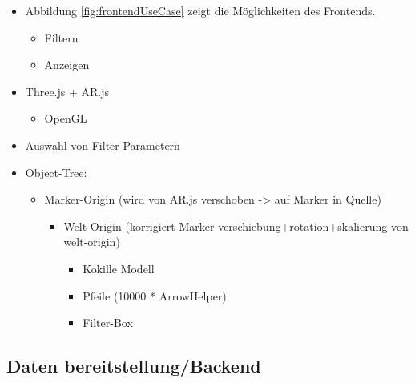 \begin{itemize}
	\item Abbildung \ref{fig:frontendUseCase} zeigt
		die Möglichkeiten des Frontends.
	\begin{itemize}
		\item Filtern
		\item Anzeigen
	\end{itemize}
	
	\item Three.js + AR.js
	\begin{itemize}
		\item OpenGL
	\end{itemize}

	\item Auswahl von Filter-Parametern
	\item Object-Tree:
	\begin{itemize}
		\item Marker-Origin (wird von AR.js verschoben -> auf Marker in Quelle)
		\begin{itemize}
			\item Welt-Origin (korrigiert Marker verschiebung+rotation+skalierung von welt-origin)
			\begin{itemize}				
				\item Kokille Modell
				\item Pfeile (10000 * ArrowHelper)
				\item Filter-Box
			\end{itemize}
		\end{itemize}
	\end{itemize}
\end{itemize}



\subsection{Daten bereitstellung/Backend}
\label{section:Backend}

